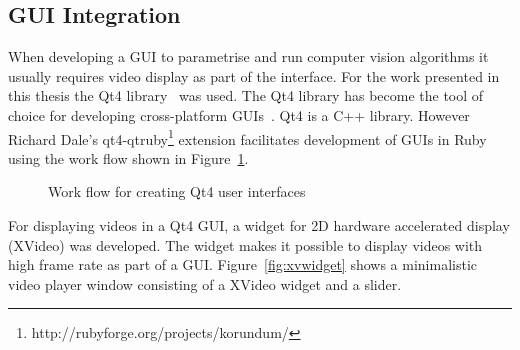 \documentclass[12pt,a4paper,oneside,openright]{book}
\newcommand{\fig}[1]{Figure~\ref{fig:#1}}
\begin{document}
\begin{CJK}{UTF8}{}
\section{\acs{GUI} Integration}\label{cha:gui}
When developing a \ac{GUI} to parametrise and run computer vision algorithms it usually requires video display as part of the interface. For the work presented in this thesis the Qt4 library~\citep{qt4white} was used. The Qt4 library has become the tool of choice for developing cross-platform \acp{GUI}~\citep{qt4}. Qt4 is a C++ library. However Richard Dale's qt4-qtruby\footnote{http://rubyforge.org/projects/korundum/} extension facilitates development of \acp{GUI} in Ruby using the work flow shown in \fig{rbuic}.
\begin{figure}[htbp]
  \begin{center}
    \caption{Work flow for creating Qt4 user interfaces\label{fig:rbuic}}
  \end{center}
\end{figure}
For displaying videos in a Qt4 \ac{GUI}, a widget for \ac{2D} hardware accelerated display (XVideo) was developed. The widget makes it possible to display videos with high frame rate as part of a \ac{GUI}. \fig{xvwidget} shows a minimalistic video player window consisting of a XVideo widget and a slider.
\begin{figure}[htbp]
  \begin{center}

\end{center}
\end{figure}
\end{CJK}
\end{document}
